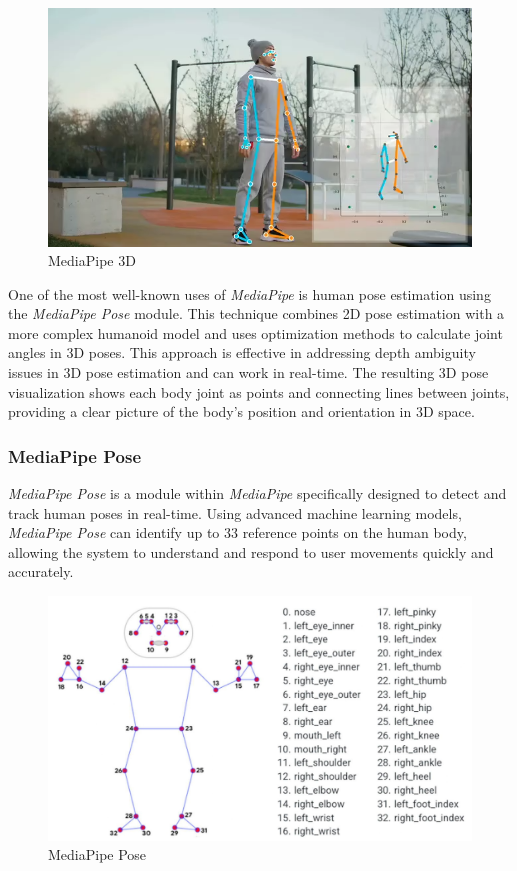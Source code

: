 \begin{figure}[H]
  \centering
  \includegraphics[scale=0.35]{gambar/MediaPipe3D.png}
  \caption{MediaPipe 3D}
  \label{fig:MediaPipe3D}
\end{figure}

One of the most well-known uses of \emph{MediaPipe} is human pose estimation using the \emph{MediaPipe Pose} module. This technique combines 2D pose estimation with a more complex humanoid model and uses optimization methods to calculate joint angles in 3D poses. This approach is effective in addressing depth ambiguity issues in 3D pose estimation and can work in real-time. The resulting 3D pose visualization shows each body joint as points and connecting lines between joints, providing a clear picture of the body's position and orientation in 3D space.

\vspace{5pt}
\subsubsection{MediaPipe Pose}
\label{subsubsec:MediaPipe Pose}

\emph{MediaPipe Pose} is a module within \emph{MediaPipe} specifically designed to detect and track human poses in real-time. Using advanced machine learning models, \emph{MediaPipe Pose} can identify up to 33 reference points on the human body, allowing the system to understand and respond to user movements quickly and accurately.

\begin{figure}[H]
  \centering
  \includegraphics[scale=0.5]{gambar/mp_pose.jpg}
  \caption{MediaPipe Pose}
  \label{fig:mp_pose}
\end{figure}

